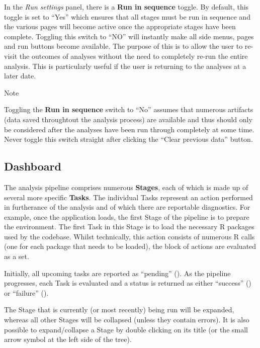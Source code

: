 \documentclass[
  8pt,
  a4paper]{article}
\begin{document}
In the \emph{Run settings} panel, there is a \textbf{Run in sequence}
toggle. By default, this toggle is set to ``Yes'' which ensures that all
stages must be run in sequence and the various pages will become active
once the appropriate stages have been complete. Toggling this switch to
``NO'' will instantly make all side menus, pages and run buttons become
available. The purpose of this is to allow the user to re-visit the
outcomes of analyses without the need to completely re-run the entire
analysis. This is particularly useful if the user is returning to the
analyses at a later date.

\begin{tcolorbox}[enhanced jigsaw, left=2mm, colback=white, leftrule=.75mm, breakable, colframe=quarto-callout-color-frame, arc=.35mm, toprule=.15mm, opacityback=0, rightrule=.15mm, bottomrule=.15mm]

Note

Toggling the \textbf{Run in sequence} switch to ``No'' assumes that
numerous artifacts (data saved throughtout the analysis process) are
available and thus should only be considered after the analyses have
been run through completely at some time. Never toggle this switch
straight after clicking the ``Clear previous data'' button.

\end{tcolorbox}

\subsection{Dashboard}\label{sec-dashboard}

The analysis pipeline comprises numerous \textbf{Stages}, each of which
is made up of several more specific \textbf{Tasks}. The individual Tasks
represent an action performed in furtherance of the analysis and of
which there are reportable diagnostics. For example, once the
application loads, the first Stage of the pipeline is to prepare the
environment. The first Task in this Stage is to load the necessary R
packages used by the codebase. Whilst technically, this action consists
of numerous R calls (one for each package that needs to be loaded), the
block of actions are evaluated as a set.

Initially, all upcoming tasks are reported as ``pending'' ({}). As the
pipeline progresses, each Task is evaluated and a status is returned as
either ``success'' ({}) or ``failure'' ({}).

The Stage that is currently (or most recently) being run will be
expanded, whereas all other Stages will be collapsed (unless they
contain errors). It is also possible to expand/collapse a Stage by
double clicking on its title (or the small arrow symbol at the left side
of the tree).
\end{document}
